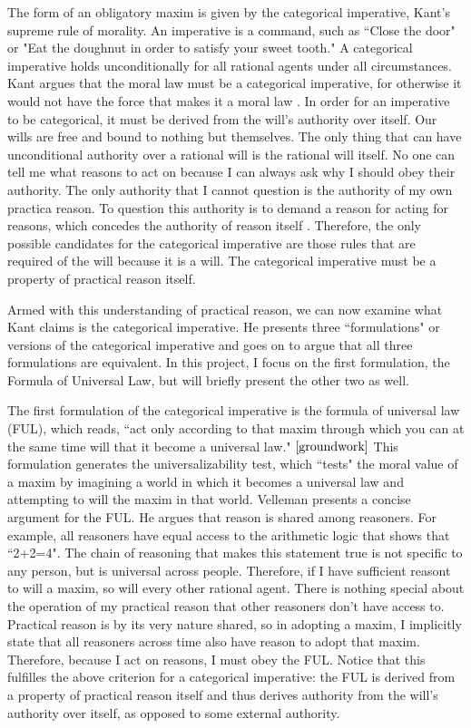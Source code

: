 \begin{isabellebody}
\begin{isamarkuptext}
The form of an obligatory maxim is given by the categorical imperative, Kant's supreme rule of morality. 
An imperative is a command, such as ``Close the door" or "Eat the doughnut in order to satisfy your 
sweet tooth." A categorical imperative holds unconditionally for all rational agents under all 
circumstances. Kant argues that the moral law must be a categorical imperative, for otherwise it would 
not have the force that makes it a moral law \cite[5]{groundwork}. In order for an imperative to be 
categorical, it must be derived from the will's authority over itself. Our wills are free and bound to 
nothing but themselves. The only thing that can have unconditional authority over a rational will is 
the rational will itself. No one can tell me what reasons to act on because I can always ask why I 
should obey their authority. The only authority that I cannot question is the authority of my own 
practica reason. To question this authority is to demand a reason for acting for reasons, which 
concedes the authority of reason itself \cite[23]{velleman}. Therefore, the only possible candidates 
for the categorical imperative are those rules that are required of the will because it is a will. 
The categorical imperative must be a property of practical reason itself.

Armed with this understanding of practical reason, we can now examine what Kant claims is the categorical 
imperative. He presents three ``formulations" or versions of the categorical imperative and goes on to 
argue that all three formulations are equivalent. In this project, I focus on the first formulation,
the Formula of Universal Law, but will briefly present the other two as well. 

The first formulation of the categorical imperative is the
formula of universal law (FUL), which reads, ``act only according to that maxim through which you can 
at the same time will that it become a universal law." $\cite[34]{groundwork}$ This formulation
generates the universalizability test, which ``tests" the moral value of a maxim by 
imagining a world in which it becomes a universal law and attempting to will the maxim in that world.
Velleman presents a concise argument for the FUL. He argues that reason is shared among reasoners. For 
example, all reasoners have equal access to the arithmetic logic that shows that ``2+2=4"\cite[29]{velleman}. The chain of 
reasoning that makes this statement true is not specific to any person, but is universal across people. 
Therefore, if I have sufficient reasont to will a maxim, so will every other rational agent. There is 
nothing special about the operation of my practical reason that other reasoners don't have access to. 
Practical reason is by its very nature shared, so in adopting a maxim, I implicitly state that all reasoners
across time also have reason to adopt that maxim. Therefore, because I act on reasons, I must obey the 
FUL. Notice that this fulfilles the above criterion for a categorical imperative: the FUL is derived from 
a property of practical reason itself and thus derives authority from the will's authority over itself, 
as opposed to some external authority.


\end{isamarkuptext}
\end{isabellebody}
